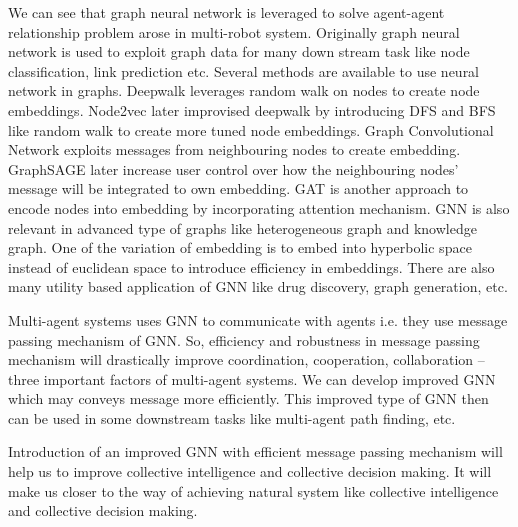 \documentclass[serif,professionalfont]{article}
\begin{document}
We can see that graph neural network is leveraged to solve agent-agent relationship problem arose in multi-robot system. Originally graph neural network is used to exploit graph data for many down stream task like node classification, link prediction etc. Several methods are available to use neural network in graphs. Deepwalk\cite{deepwalk} leverages random walk on nodes to create node embeddings. Node2vec\cite{node2vec} later improvised deepwalk\cite{deepwalk} by introducing DFS and BFS like random walk to create more tuned node embeddings. Graph Convolutional Network\cite{gcn} exploits messages from neighbouring nodes to create embedding. GraphSAGE\cite{graphsage} later increase user control over how the neighbouring nodes' message will be integrated to own embedding. GAT\cite{gat} is another approach to encode nodes into embedding by incorporating attention mechanism. GNN is also relevant in advanced type of graphs like heterogeneous graph\cite{HeterogeneousMultiRobotReinforcementLearning} and knowledge graph. One of the variation of embedding is to embed into hyperbolic space instead of euclidean space to introduce efficiency in embeddings. There are also many utility based application of GNN like drug discovery, graph generation, etc.

Multi-agent systems uses GNN to communicate with agents i.e. they use message passing mechanism of GNN. So, efficiency and robustness in message passing mechanism will drastically improve coordination, cooperation, collaboration -- three important factors of multi-agent systems. We can develop improved GNN which may conveys message more efficiently. This improved type of GNN then can be used in some downstream tasks like multi-agent path finding, etc.

Introduction of an improved GNN with efficient message passing mechanism will help us to improve collective intelligence and collective decision making. It will make us closer to the way of achieving natural system like collective intelligence and collective decision making.
\newpage



\end{document}
